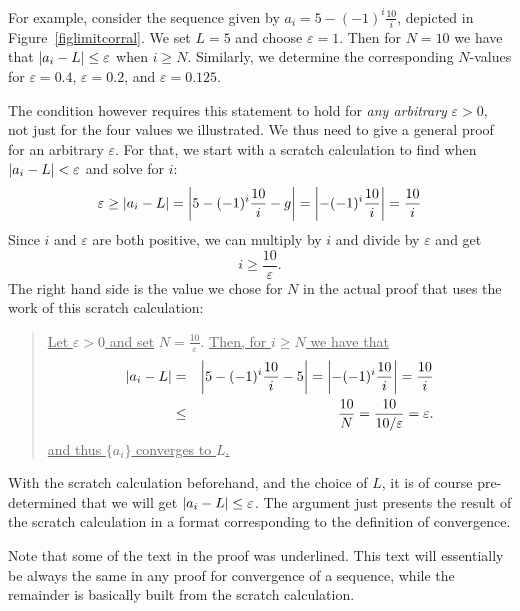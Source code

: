 For example, consider the sequence given by
$a_i=5-(-1)^i\frac{10}{i}$, depicted in Figure~\ref{figlimitcorral}. We set
$L=5$ and choose $\varepsilon=1$. Then for $N=10$ we have
that $\left|a_i-L\right|\le\varepsilon$ when $i\ge N$. Similarly, we
determine the corresponding $N$-values for $\varepsilon=0.4$,
$\varepsilon=0.2$, and $\varepsilon=0.125$.

The condition however requires this statement to hold for {\em any
arbitrary} $\varepsilon>0$, not just for the four values we illustrated. We
thus need to give a general proof for an arbitrary $\varepsilon$. For that,
we start with a scratch calculation to find when $\left|a_i-L\right|<\varepsilon$
and solve for $i$:
\[
\varepsilon\ge \left|a_i-L\right|=\left|5-(-1)^i\frac{10}{i}-g\right|=\left|-(-1)^i\frac{10}{i}\right|=
\frac{10}{i}
\]
Since $i$ and $\varepsilon$ are both positive, we can multiply by $i$ and
divide by $\varepsilon$ and get
\[
i\ge\frac{10}{\varepsilon}.
\]
The right hand side is the value we chose for $N$ in the actual proof that
uses the work of this scratch calculation:

\begin{quote}
\underline{Let $\varepsilon>0$ and set} $N=\frac{10}{\varepsilon}$.
\underline{Then, for $i\ge N$ we have that}
\begin{eqnarray*}
\left|a_i-L\right|&=&\left|5-(-1)^i\frac{10}{i}-5\right|=\left|-(-1)^i\frac{10}{i}\right|=
\frac{10}{i}\\
&\le&\frac{10}{N}=\frac{10}{10/\varepsilon}=\varepsilon.
\end{eqnarray*}
\underline{and thus $\{a_i\}$ converges to $L$.}
\end{quote}

With the scratch calculation beforehand, and the choice of $L$, it is of
course pre-determined that we will get $\left|a_i-L\right|\le\varepsilon$. The
argument just presents the result of the scratch calculation in a format
corresponding to the definition of convergence.

Note that some of the text in the proof was underlined. This text will
essentially be always the same in any proof for convergence of a sequence,
while the remainder is basically built from the scratch calculation.

